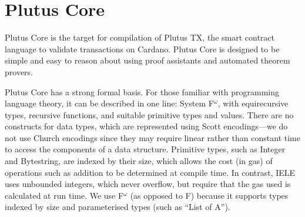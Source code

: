 \documentclass[conference]{IEEEtran}
\newcommand{\Fomega}{F$^{\omega}$}
\begin{document}







%
\IEEEpeerreviewmaketitle




\section{Plutus Core}

Plutus Core is the target for compilation of Plutus TX, the smart
contract language to validate transactions on Cardano. Plutus Core is
designed to be simple and easy to reason about using proof assistants
and automated theorem provers.

Plutus Core has a strong formal basis. For those familiar with
programming language theory, it can be described in one line: System
\Fomega{}, with equirecursive types, recursive functions, and suitable
primitive types and values. There are no constructs for data types,
which are represented using Scott encodings---we do not use Church
encodings since they may require linear rather than constant time to
access the components of a data structure. Primitive types, such as
Integer and Bytestring, are indexed by their size, which allows the
cost (in gas) of operations such as addition to be determined at
compile time. In contrast, IELE uses unbounded integers, which never
overflow, but require that the gas used is calculated at run time. We
use \Fomega{} (as opposed to F) because it supports types indexed by
size and parameterised types (such as ``List of A'').
\end{document}
